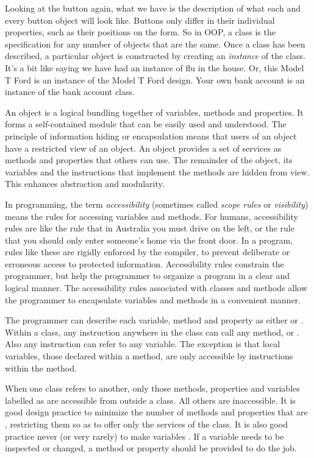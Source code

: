 		Looking at the button again, what we have is the description of what each and every button object will look like. Buttons only differ in their individual properties, such as their positions on the form. So in OOP, a class is the specification for any number of objects that are the same. Once a class has been described, a particular object is constructed by creating an \emph{instance} of the class. It's a bit like saying we have had an instance of flu in the house. Or, this Model T Ford is an instance of the Model T Ford design. Your own bank account is an instance of the bank account class.
		
		An object is a logical bundling together of variables, methods and properties. It forms a self-contained module that can be easily used and understood. The principle of information hiding or encapsulation means that users of an object have a restricted view of an object. An object provides a set of services as  methods and properties that others can use. The remainder of the object, its variables and the instructions that implement the methods are hidden from view. This enhances abstraction and modularity.
		
		In programming, the term \emph{accessibility} (sometimes called \emph{scope rules} or \emph{visibility}) means the rules for accessing variables and methods. For humans, accessibility rules are like the rule that in Australia you must drive on the left, or the rule that you should only enter someone's home via the front door. In a program, rules like these are rigidly enforced by the compiler, to prevent deliberate or erroneous access to protected information. Accessibility rules constrain the programmer, but help the programmer to organize a program in a clear and logical manner. The accessibility rules associated with classes and methods allow the programmer to encapsulate variables and methods in a convenient manner.
		
		The programmer can describe each variable, method and property as either  or . Within a class, any instruction anywhere in the class can call any method,  or . Also any instruction can refer to any variable. The exception is that local variables, those declared within a method, are only accessible by instructions within the method.
		
		When one class refers to another, only those methods, properties and variables labelled as  are accessible from outside a class. All others are inaccessible. It is good design practice to minimize the number of methods and properties that are , restricting them so as to offer only the services of the class. It is also good practice never (or very rarely) to make variables . If a variable needs to be inspected or changed, a method or property should be provided to do the job.
		
